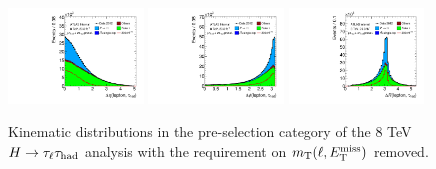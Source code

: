 \begin{figure}[tp]
  \includegraphics[width=0.32\textwidth]{figures/presel/taulep-deta}
  \includegraphics[width=0.32\textwidth]{figures/presel/taulep-dphi}
  \includegraphics[width=0.32\textwidth]{figures/presel/taulep-dR} \\
  \caption{Kinematic distributions in the pre-selection category of the 8 TeV $H\rightarrow\tau_\ell\tau_\text{had}$ analysis with the requirement on $m_\text{T}(\ell, E_{\mathrm{T}}^{\mathrm{miss}})$ removed.}
  \label{fig:stategy-presel-1}
\end{figure}

\clearpage

